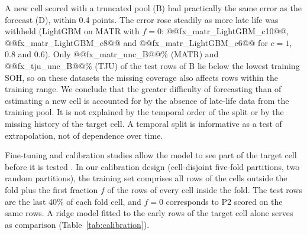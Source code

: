 \documentclass{ieeeaccess}
\newcommand{\fitwide}[1]{\footnotesize\resizebox{\ifdim\width>\textwidth\textwidth\else\width\fi}{!}{}}
\begin{document}
A new cell scored with a truncated pool (B) had practically the same error as the forecast (D), within 0.4 points. The error rose steadily as more late life was withheld (LightGBM on MATR with $f=0$: @@fx_matr_LightGBM_c10@@, @@fx_matr_LightGBM_c8@@ and @@fx_matr_LightGBM_c6@@ for $c=1$, 0.8 and 0.6). Only @@fx_matr_unc_B@@\% (MATR) and @@fx_tju_unc_B@@\% (TJU) of the test rows of B lie below the lowest training SOH, so on these datasets the missing coverage also affects rows within the training range. We conclude that the greater difficulty of forecasting than of estimating a new cell is accounted for by the absence of late-life data from the training pool. It is not explained by the temporal order of the split or by the missing history of the target cell. A temporal split is informative as a test of extrapolation, not of dependence over time.
\begin{table}[!t]
\centering
\caption{Pooled RMSE (\% SOH) on the last 40\% of each fold cell for the corners of the factorial design (A: other cells whole life, target absent; B: other cells first 60\%, target absent; C: other cells whole life, first 60\% of target; D: all cells first 60\%), the difference D minus A with its 95\% cluster-bootstrap interval over cells, and the share of this difference attributable to coverage (average of the two orders of adding the factors; not defined when the interval of the difference includes values below 1 point).}
\label{tab:factorial}
\scriptsize
\fitwide{tables/factorial.tex}
\end{table}

\label{sec:res_calibration}
Fine-tuning and calibration studies allow the model to see part of the target cell before it is tested \cite{aud25,aud49}. In our calibration design (cell-disjoint five-fold partitions, two random partitions), the training set comprises all rows of the cells outside the fold plus the first fraction $f$ of the rows of every cell inside the fold. The test rows are the last 40\% of each fold cell, and $f=0$ corresponds to P2 scored on the same rows. A ridge model fitted to the early rows of the target cell alone serves as comparison (Table~\ref{tab:calibration}).
\end{document}
